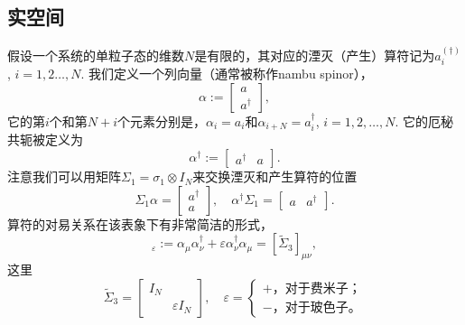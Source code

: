 \subsection{实空间}
假设一个系统的单粒子态的维数$N$是有限的，其对应的湮灭（产生）算符记为$a^{(\dagger)}_i$, $i=1,2\dots,N$. 我们定义一个列向量（通常被称作nambu spinor），
\begin{equation}
  \alpha := \begin{bmatrix}
      a\\
      a^\dagger
  \end{bmatrix},
\end{equation}
它的第$i$个和第$N+i$个元素分别是，$\alpha_i=a_i$和$\alpha_{i+N}=a^\dagger_{i}$, $i=1,2,\dots,N$. 它的厄秘共轭被定义为
\begin{equation}
  \alpha^\dagger:=\begin{bmatrix}
      a^\dagger & a
  \end{bmatrix}.
\end{equation}
注意我们可以用矩阵$\Sigma_1=\sigma_1\otimes I_N$来交换湮灭和产生算符的位置
\begin{equation}
  \Sigma_1 \alpha = \begin{bmatrix}
      a^\dagger \\
      a
  \end{bmatrix},\quad \alpha^\dagger \Sigma_1 = \begin{bmatrix}
      a & a^\dagger
  \end{bmatrix}.
\end{equation}
算符的对易关系在该表象下有非常简洁的形式，
\begin{equation}
  [\alpha_\mu,\alpha^\dagger_\nu]_\varepsilon :=\alpha_\mu\alpha^\dagger_\nu +\varepsilon \alpha^\dagger_\nu \alpha_\mu=[\tilde \Sigma_3]_{\mu\nu},
\end{equation}
这里
\begin{equation}
  \tilde \Sigma_3=\begin{bmatrix}
      I_N & \\
      & \varepsilon I_N
  \end{bmatrix},\quad \varepsilon=\begin{cases}
      +\text{，对于费米子；}\\
      -\text{，对于玻色子。}
  \end{cases}
\end{equation}

